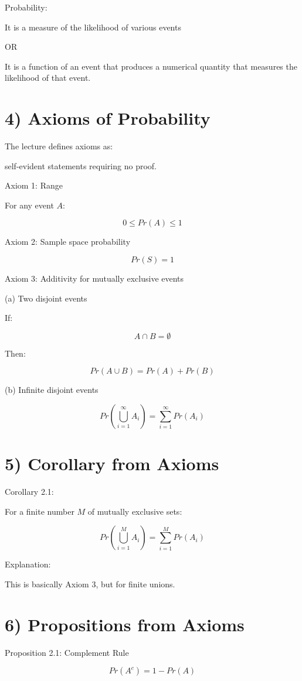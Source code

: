 \documentclass[12pt,a4paper]{article}
\begin{document}
Probability:

It is a measure of the likelihood of various events

OR

It is a function of an event that produces a numerical quantity that measures the likelihood of that event.

\section*{4) Axioms of Probability}

The lecture defines axioms as:

self-evident statements requiring no proof.

Axiom 1: Range

For any event $A$:

\[
0 \le Pr(A) \le 1
\]

Axiom 2: Sample space probability

\[
Pr(S) = 1
\]

Axiom 3: Additivity for mutually exclusive events

(a) Two disjoint events

If:

\[
A \cap B = \emptyset
\]

Then:

\[
Pr(A \cup B) = Pr(A) + Pr(B)
\]

(b) Infinite disjoint events

\[
Pr\left(\bigcup_{i=1}^{\infty} A_i\right)
=
\sum_{i=1}^{\infty} Pr(A_i)
\]

\section*{5) Corollary from Axioms}

Corollary 2.1:

For a finite number $M$ of mutually exclusive sets:

\[
Pr\left(\bigcup_{i=1}^{M} A_i\right)
=
\sum_{i=1}^{M} Pr(A_i)
\]

Explanation:

This is basically Axiom 3, but for finite unions.

\section*{6) Propositions from Axioms}

Proposition 2.1: Complement Rule

\[
Pr(A^c) = 1 - Pr(A)
\]
\end{document}
